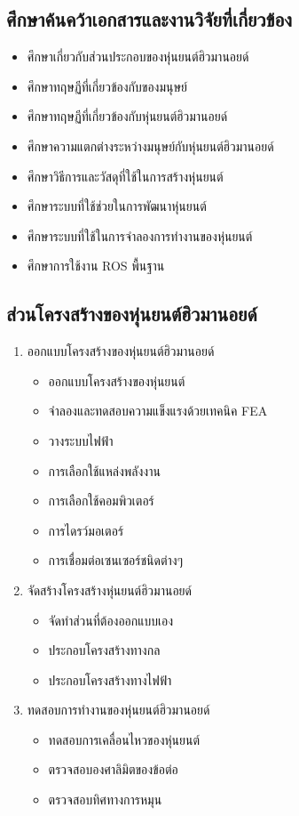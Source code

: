 \subsection{ศึกษาค้นคว้าเอกสารและงานวิจัยที่เกี่ยวข้อง}
\begin{itemize}\setlength\itemsep{-0.3em}
	\item ศึกษาเกี่ยวกับส่วนประกอบของหุ่นยนต์ฮิวมานอยด์
	\item ศึกษาทฤษฏีที่เกี่ยวข้องกับของมนุษย์
	\item ศึกษาทฤษฏีที่เกี่ยวข้องกับหุ่นยนต์ฮิวมานอยด์
	\item ศึกษาความแตกต่างระหว่างมนุษย์กับหุ่นยนต์ฮิวมานอยด์
	\item ศึกษาวิธีการและวัสดุที่ใช้ในการสร้างหุ่นยนต์
	\item ศึกษาระบบที่ใช้ช่วยในการพัฒนาหุ่นยนต์
	\item ศึกษาระบบที่ใช้ในการจำลองการทำงานของหุ่นยนต์
	\item ศึกษาการใช้งาน ROS พื้นฐาน
\end{itemize}
\subsection{ส่วนโครงสร้างของหุ่นยนต์ฮิวมานอยด์}
\begin{enumerate}[label=\arabic*, leftmargin=1.5cm]
	\item ออกแบบโครงสร้างของหุ่นยนต์ฮิวมานอยด์\vspace{-3mm}
	\begin{itemize}\setlength\itemsep{-0.3em}
		\item ออกแบบโครงสร้างของหุ่นยนต์
		\item จำลองและทดสอบความแข็งแรงด้วยเทคนิค FEA
		\item วางระบบไฟฟ้า
		\item การเลือกใช้แหล่งพลังงาน
		\item การเลือกใช้คอมพิวเตอร์
		\item การไดรว์มอเตอร์
		\item การเชื่อมต่อเซนเซอร์ชนิดต่างๆ
	\end{itemize}
	\item จัดสร้างโครงสร้างหุ่นยนต์ฮิวมานอยด์\vspace{-3mm}
	\begin{itemize}\setlength\itemsep{-0.3em}
		\item จัดทำส่วนที่ต้องออกแบบเอง
		\item ประกอบโครงสร้างทางกล
		\item ประกอบโครงสร้างทางไฟฟ้า
	\end{itemize}
	\item ทดสอบการทำงานของหุ่นยนต์ฮิวมานอยด์\vspace{-3mm}
	\begin{itemize}\setlength\itemsep{-0.3em}
		\item ทดสอบการเคลื่อนไหวของหุ่นยนต์
		\item ตรวจสอบองศาลิมิตของข้อต่อ
		\item ตรวจสอบทิศทางการหมุน
	\end{itemize}
\end{enumerate}

